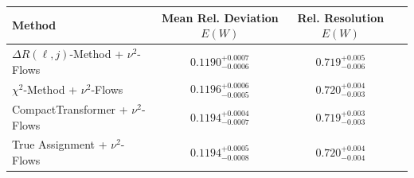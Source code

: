     \begin{tabular}{lccc}
        \toprule
        Method & Mean Rel. Deviation $E(W)$ & Rel. Resolution $E(W)$ \\
        \midrule
        $\Delta R(\ell,j)$-Method + $\nu^2$-Flows & $0.1190^{+0.0007}_{-0.0006}$ & $0.719^{+0.005}_{-0.006}$ \\
        $\chi^2$-Method + $\nu^2$-Flows & $0.1196^{+0.0006}_{-0.0005}$ & $0.720^{+0.004}_{-0.003}$ \\
        CompactTransformer + $\nu^2$-Flows & $0.1194^{+0.0004}_{-0.0007}$ & $0.719^{+0.003}_{-0.003}$ \\
        True Assignment + $\nu^2$-Flows & $0.1194^{+0.0005}_{-0.0008}$ & $0.720^{+0.004}_{-0.004}$ \\
        \bottomrule
    \end{tabular}
